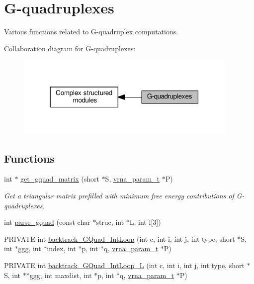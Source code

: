 \hypertarget{group__gquads}{}\section{G-\/quadruplexes}
\label{group__gquads}


Various functions related to G-\/quadruplex computations.  


Collaboration diagram for G-\/quadruplexes\+:
\nopagebreak
\begin{figure}[H]
\begin{center}
\leavevmode
\includegraphics[width=303pt]{group__gquads}
\end{center}
\end{figure}
\subsection*{Functions}
\begin{DoxyCompactItemize}
\item 
int $\ast$ \hyperlink{group__gquads_ga392e45c9615aa123737671603fa4203c}{get\+\_\+gquad\+\_\+matrix} (short $\ast$S, \hyperlink{group__energy__parameters_ga8a69ca7d787e4fd6079914f5343a1f35}{vrna\+\_\+param\+\_\+t} $\ast$P)
\begin{DoxyCompactList}\small\item\em Get a triangular matrix prefilled with minimum free energy contributions of G-\/quadruplexes. \end{DoxyCompactList}\item 
int \hyperlink{group__gquads_gae41763215b9c64d2a7b67f0df8a28078}{parse\+\_\+gquad} (const char $\ast$struc, int $\ast$L, int l\mbox{[}3\mbox{]})
\item 
P\+R\+I\+V\+A\+TE int \hyperlink{group__gquads_ga220c41e8dbcee940ac975b8ce88e55c5}{backtrack\+\_\+\+G\+Quad\+\_\+\+Int\+Loop} (int c, int i, int j, int type, short $\ast$S, int $\ast$ggg, int $\ast$index, int $\ast$p, int $\ast$q, \hyperlink{group__energy__parameters_ga8a69ca7d787e4fd6079914f5343a1f35}{vrna\+\_\+param\+\_\+t} $\ast$P)
\item 
P\+R\+I\+V\+A\+TE int \hyperlink{group__gquads_ga7b371308fa5a45c7ac353ef6ed1014de}{backtrack\+\_\+\+G\+Quad\+\_\+\+Int\+Loop\+\_\+L} (int c, int i, int j, int type, short $\ast$S, int $\ast$$\ast$ggg, int maxdist, int $\ast$p, int $\ast$q, \hyperlink{group__energy__parameters_ga8a69ca7d787e4fd6079914f5343a1f35}{vrna\+\_\+param\+\_\+t} $\ast$P)
\end{DoxyCompactItemize}


